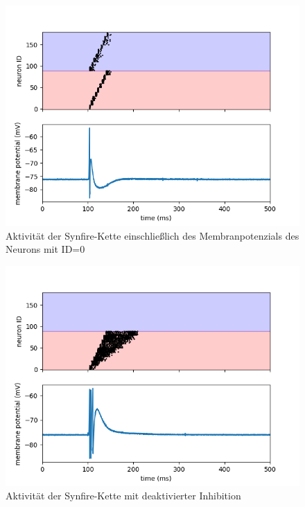 \documentclass[10pt,a4paper]{scrartcl}
\begin{document}
\begin{figure} [ht]
\begin{center}
\label{fig:abb33}
\caption{Aktivität der Synfire-Kette einschließlich des Membranpotenzials des Neurons mit ID=0}
\includegraphics[scale=0.35]{pictures/task1_synfire_chain.png}
\end{center}
\end{figure}

\begin{figure} [ht]
\begin{center}
\label{fig:abb34}
\caption{Aktivität der Synfire-Kette mit deaktivierter Inhibition}
\includegraphics[scale=0.35]{pictures/synfire_chain_disable_inhibition.png}
\end{center}
\end{figure}
\end{document}
